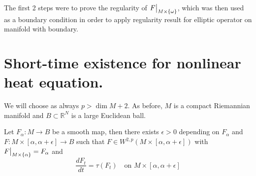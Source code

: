 \begin{remark}
The first 2 steps were to prove the regularity of \(\restr{F}{M\times
\{\omega\}}\), which was then used as a boundary condition in
order to apply regularity result for elliptic operator on manifold with boundary.
\end{remark}




\section{Short-time existence for nonlinear heat equation.}
\label{sec:org6dd8c2b}
We will choose as always \(p > \dim M +2\). As before, \(M\) is a compact Riemannian
manifold and \(B\subset \mathbb{R}^N\) is a large Euclidean ball.

\begin{theorem}
\label{thm:short-time}
Let \(F_\alpha: M \longrightarrow  B\) be a smooth map, then there exists \(\epsilon>0\) depending on \(F_\alpha\) and \(F: M\times [\alpha,\alpha + \epsilon] \longrightarrow
B\) such that \(F\in W^{2,p}(M\times [\alpha,\alpha+\epsilon])\) with \(\restr{F}{M\times \{\alpha\}} = F_\alpha\) and
\[
 \frac{d F_t}{dt} = \tau(F_t) \quad \text{on } M\times [\alpha,\alpha +\epsilon]
\]
\end{theorem}

